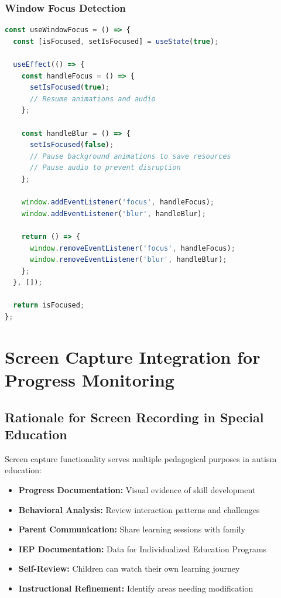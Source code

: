 \documentclass[12pt, a4paper]{article}
\begin{document}
\subsubsection{Window Focus Detection}

\begin{lstlisting}[language=JavaScript, caption=Focus Management]
const useWindowFocus = () => {
  const [isFocused, setIsFocused] = useState(true);
  
  useEffect(() => {
    const handleFocus = () => {
      setIsFocused(true);
      // Resume animations and audio
    };
    
    const handleBlur = () => {
      setIsFocused(false);
      // Pause background animations to save resources
      // Pause audio to prevent disruption
    };
    
    window.addEventListener('focus', handleFocus);
    window.addEventListener('blur', handleBlur);
    
    return () => {
      window.removeEventListener('focus', handleFocus);
      window.removeEventListener('blur', handleBlur);
    };
  }, []);
  
  return isFocused;
};
\end{lstlisting}

\newpage

\section{Screen Capture Integration for Progress Monitoring}

\subsection{Rationale for Screen Recording in Special Education}

Screen capture functionality serves multiple pedagogical purposes in autism education:

\begin{itemize}[leftmargin=*]
    \item \textbf{Progress Documentation:} Visual evidence of skill development
    \item \textbf{Behavioral Analysis:} Review interaction patterns and challenges
    \item \textbf{Parent Communication:} Share learning sessions with family
    \item \textbf{IEP Documentation:} Data for Individualized Education Programs
    \item \textbf{Self-Review:} Children can watch their own learning journey
    \item \textbf{Instructional Refinement:} Identify areas needing modification
\end{itemize}
\end{document}
